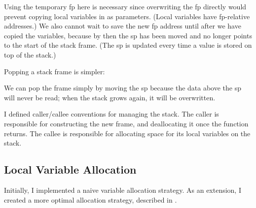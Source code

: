 \documentclass[00-main.tex]{subfiles}
\begin{document}
Using the temporary \gls{fp} here is necessary since overwriting the \gls{fp} directly would prevent copying local variables in as parameters.
(Local variables have \gls{fp}-relative addresses.)
We also cannot wait to save the new \gls{fp} address until after we have copied the variables, because by then the \gls{sp} has been moved and no longer points to the start of the stack frame.
(The \gls{sp} is updated every time a value is stored on top of the stack.)

Popping a stack frame is simpler:


We can pop the frame simply by moving the \gls{sp} because the data above the \gls{sp} will never be read; when the stack grows again, it will be overwritten.

I defined caller/callee conventions for managing the stack.
The caller is responsible for constructing the new frame, and deallocating it once the function returns.
The callee is responsible for allocating space for its local variables on the stack.


\subsection{Local Variable Allocation}\label{sec:impl:local variable allocation}

Initially, I implemented a naive variable allocation strategy.
As an extension, I created a more optimal allocation strategy, described in .
\end{document}
